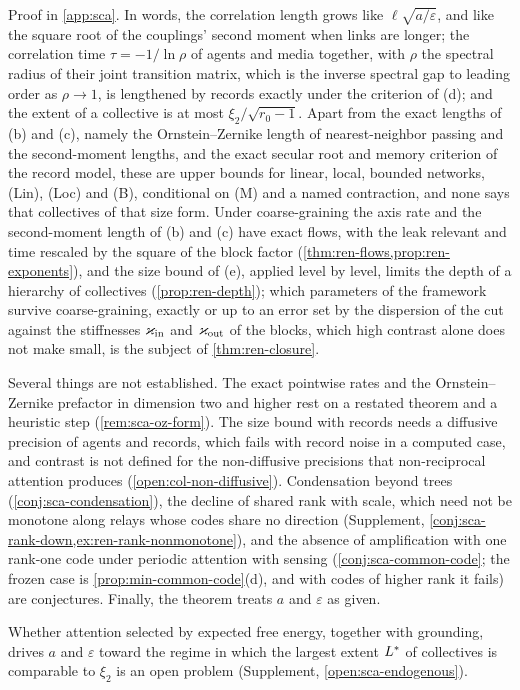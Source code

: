 Proof in \cref{app:sca}. In words, the correlation length grows like $\ell\sqrt{a/\varepsilon}$, and like the square root of the couplings' second moment when links are longer; the correlation time $\tau=-1/\ln\rho$ of agents and media together, with $\rho$ the spectral radius of their joint transition matrix, which is the inverse spectral gap to leading order as $\rho\to1$, is lengthened by records exactly under the criterion of (d); and the extent of a collective is at most $\xi_2/\sqrt{r_0-1}$. Apart from the exact lengths of (b) and (c), namely the Ornstein--Zernike length of nearest-neighbor passing and the second-moment lengths, and the exact secular root and memory criterion of the record model, these are upper bounds for linear, local, bounded networks, \textup{(Lin)}, \textup{(Loc)} and \textup{(B)}, conditional on \textup{(M)} and a named contraction, and none says that collectives of that size form. Under coarse-graining the axis rate and the second-moment length of (b) and (c) have exact flows, with the leak relevant and time rescaled by the square of the block factor (\cref{thm:ren-flows,prop:ren-exponents}), and the size bound of (e), applied level by level, limits the depth of a hierarchy of collectives (\cref{prop:ren-depth}); which parameters of the framework survive coarse-graining, exactly or up to an error set by the dispersion of the cut against the stiffnesses $\varkappa_{\mathrm{in}}$ and $\varkappa_{\mathrm{out}}$ of the blocks, which high contrast alone does not make small, is the subject of \cref{thm:ren-closure}.

Several things are not established. The exact pointwise rates and the Ornstein--Zernike prefactor in dimension two and higher rest on a restated theorem and a heuristic step (\cref{rem:sca-oz-form}). The size bound with records needs a diffusive precision of agents and records, which fails with record noise in a computed case, and contrast is not defined for the non-diffusive precisions that non-reciprocal attention produces (\cref{open:col-non-diffusive}). Condensation beyond trees (\cref{conj:sca-condensation}), the decline of shared rank with scale, which need not be monotone along relays whose codes share no direction (Supplement, \cref{conj:sca-rank-down,ex:ren-rank-nonmonotone}), and the absence of amplification with one rank-one code under periodic attention with sensing (\cref{conj:sca-common-code}; the frozen case is \cref{prop:min-common-code}(d), and with codes of higher rank it fails) are conjectures. Finally, the theorem treats $a$ and $\varepsilon$ as given.

Whether attention selected by expected free energy, together with grounding, drives $a$ and $\varepsilon$ toward the regime in which the largest extent $L^{\ast}$ of collectives is comparable to $\xi_2$ is an open problem (Supplement, \cref{open:sca-endogenous}).
